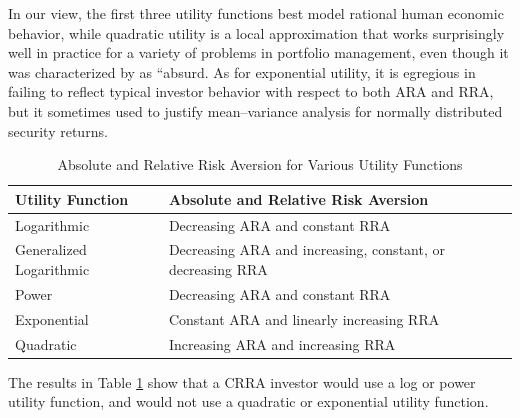 \documentclass[graybox,envcountchap,sectrefs]{svmono}\usepackage[]{graphicx}\usepackage[]{xcolor}
\begin{document}
\begin{appendices}
In our view, the first three utility functions best model rational
human economic behavior, while quadratic utility is a local approximation
that works surprisingly well in practice for a variety of problems
in portfolio management, even though it was characterized by \citet{Arrow1971}
as ``absurd\textquotedbl . As for exponential utility, it is egregious
in failing to reflect typical investor behavior with respect to both
ARA and RRA, but it sometimes used to justify mean--variance analysis
for normally distributed security returns.

\begin{table}[H]
\caption{Absolute and Relative Risk Aversion for Various Utility Functions}

\begingroup \def\table{\begin{center}\fontsize{10}{12}\selectfont} \def\endtable{\end{center}} 

\begin{table}
\centering\begingroup\fontsize{11}{13}\selectfont

\begin{tabular}{>{\raggedright\arraybackslash}p{12em}>{\raggedright\arraybackslash}p{26em}}
\toprule
Utility Function & Absolute and Relative Risk Aversion\\
\midrule
\hspace{1em}Logarithmic & Decreasing ARA and constant RRA\\
\hspace{1em}Generalized Logarithmic & Decreasing ARA and increasing, constant, or decreasing RRA\\
\hspace{1em}Power & Decreasing ARA and constant RRA\\
\hspace{1em}Exponential & Constant ARA and linearly increasing RRA\\
\hspace{1em}Quadratic & Increasing ARA and increasing RRA\\
\bottomrule
\end{tabular}
\endgroup{}
\end{table}



\endgroup

\label{tab:UtilityRiskAversion}
\end{table}

The results in Table \ref{tab:UtilityRiskAversion} show that a CRRA
investor would use a log or power utility function, and would not
use a quadratic or exponential utility function. 


\end{appendices}
\end{document}
